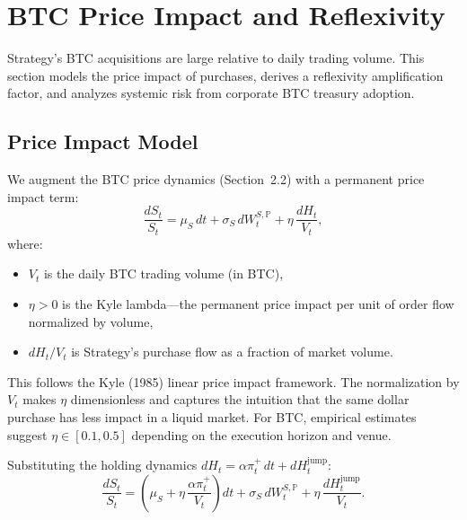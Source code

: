 
\section{BTC Price Impact and Reflexivity}
\label{sec:market_impact}

Strategy's BTC acquisitions are large relative to daily trading volume.
This section models the price impact of purchases, derives a reflexivity
amplification factor, and analyzes systemic risk from corporate BTC
treasury adoption.

\subsection{Price Impact Model}

We augment the BTC price dynamics (Section~2.2) with a permanent
price impact term:
\begin{equation}
  \frac{dS_t}{S_t} = \mu_S\,dt + \sigma_S\,dW_t^{S,\mathbb{P}}
  + \eta\,\frac{dH_t}{V_t},
  \label{eq:price_impact}
\end{equation}
where:
\begin{itemize}
  \item $V_t$ is the daily BTC trading volume (in BTC),
  \item $\eta > 0$ is the Kyle lambda---the permanent price impact
    per unit of order flow normalized by volume,
  \item $dH_t / V_t$ is Strategy's purchase flow as a fraction
    of market volume.
\end{itemize}

\begin{remark}
This follows the Kyle (1985) linear price impact framework.
The normalization by $V_t$ makes $\eta$ dimensionless and
captures the intuition that the same dollar purchase has less
impact in a liquid market.
For BTC, empirical estimates suggest $\eta \in [0.1, 0.5]$
depending on the execution horizon and venue.
\end{remark}

Substituting the holding dynamics $dH_t = \alpha\pi_t^+\,dt + dH_t^{\mathrm{jump}}$:
\begin{equation}
  \frac{dS_t}{S_t} = \left(\mu_S + \eta\,\frac{\alpha\pi_t^+}{V_t}\right)dt
  + \sigma_S\,dW_t^{S,\mathbb{P}}
  + \eta\,\frac{dH_t^{\mathrm{jump}}}{V_t}.
  \label{eq:price_impact_expanded}
\end{equation}


